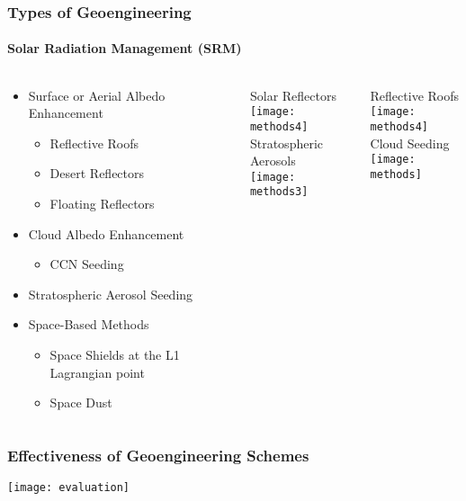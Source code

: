 \documentclass{beamer}
\begin{document}
\begin{frame}
\frametitle{Types of Geoengineering}
\framesubtitle{Solar Radiation Management (SRM)}
\begin{columns}
\begin{column}{6cm}
\begin{itemize}
	\item Surface or Aerial Albedo Enhancement
		\begin{itemize}
		\item Reflective Roofs
		\item Desert Reflectors
		\item Floating Reflectors
		\end{itemize}
	\item Cloud Albedo Enhancement
		\begin{itemize}
		\item CCN Seeding
		\end{itemize}
	\item Stratospheric Aerosol Seeding
	\item Space-Based Methods
		\begin{itemize}
		\item Space Shields at the L1 Lagrangian point
		\item Space Dust
		\end{itemize}
\end{itemize}
\end{column}
\begin{column}{2.625cm}
\centering\scriptsize Solar Reflectors\\
\texttt{[image: methods4]}\\
\centering\scriptsize Stratospheric Aerosols\\
\texttt{[image: methods3]}
\end{column}
\begin{column}{2.625cm}
\centering\scriptsize Reflective Roofs\\
\texttt{[image: methods4]}\\
\centering\scriptsize Cloud Seeding\\
\texttt{[image: methods]}
\end{column}
\end{columns}
\end{frame}


\begin{frame}
\frametitle{Effectiveness of Geoengineering Schemes}
\texttt{[image: evaluation]}
\end{frame}
\end{document}
